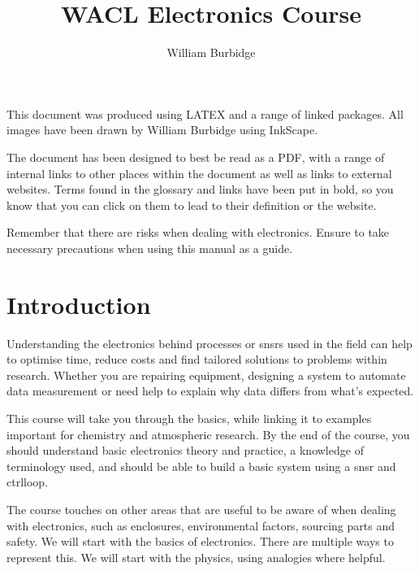 \documentclass[a4paper,11pt]{report}
\title{WACL Electronics Course}
\author{William Burbidge}
\begin{document}
\maketitle

\tableofcontents

\vspace*{3\baselineskip}

This document was produced using LATEX and a range of linked packages. All images have been drawn by William Burbidge using InkScape.

\vspace*{2\baselineskip}

The document has been designed to best be read as a PDF, with a range of internal links to other places within the document as well as links to external websites. Terms found in the glossary and links have been put in bold, so you know that you can click on them to lead to their definition or the website.

\vspace*{2\baselineskip}

Remember that there are risks when dealing with electronics. Ensure to take necessary precautions when using this manual as a guide.

\doublespacing

\pagebreak

\section{Introduction}

Understanding the electronics behind processes or \gls{snsr}s used in the field can help to optimise time, reduce costs and find tailored solutions to problems within research. Whether you are repairing equipment, designing a system to automate data measurement or need help to explain why data differs from what's expected.

This course will take you through the basics, while linking it to examples important for chemistry and atmospheric research. By the end of the course, you should understand basic electronics theory and practice, a knowledge of terminology used, and should be able to build a basic system using a \gls{snsr} and \gls{ctrlloop}.

The course touches on other areas that are useful to be aware of when dealing with electronics, such as enclosures, environmental factors, sourcing parts and safety. We will start with the basics of electronics. There are multiple ways to represent this. We will start with the physics, using analogies where helpful.
\end{document}
